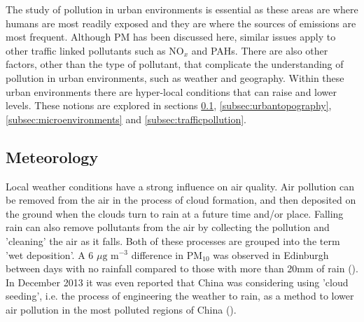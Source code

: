 The study of pollution in urban environments is essential as these areas are where humans are most readily exposed and they are where the sources of emissions are most frequent. Although PM has been discussed here, similar issues apply to other traffic linked pollutants such as NO$_{x}$ and PAHs. There are also other factors, other than the type of pollutant, that complicate the understanding of pollution in urban environments, such as weather and geography. Within these urban environments there are hyper-local conditions that can raise and lower levels. These notions are explored in sections \ref{subsec:meteorology}, \ref{subsec:urbantopography}, \ref{subsec:microenvironments} and \ref{subsec:trafficpollution}.


\subsection{Meteorology}
\label{subsec:meteorology}

Local weather conditions have a strong influence on air quality.
Air pollution can be removed from the air in the process of cloud formation, and then deposited on the ground when the clouds turn to rain at a future time and/or place. Falling rain can also remove pollutants from the air by collecting the pollution and 'cleaning' the air as it falls. Both of these processes are grouped into the term 'wet deposition'. A 6 $\mu \text{g m}^{-3}$ difference in PM$_{10}$ was observed in Edinburgh between days with no rainfall compared to those with more than 20mm of rain (\cite{DEFRA2007}). In December 2013 it was even reported that China was considering using 'cloud seeding', i.e. the process of engineering the weather to rain, as a method to lower air pollution in the most polluted regions of China (\cite{Slezak2013}).


